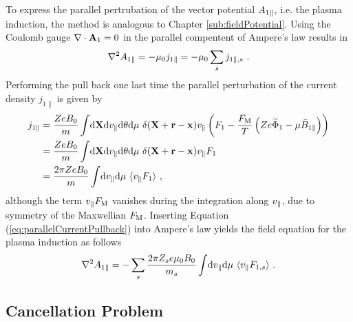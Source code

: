 To express the parallel pertrubation of the vector potential $A_{1\parallel}$, i.e. the plasma induction, the method is analogous to Chapter \ref{sub:fieldPotential}. Using the Coulomb gauge $\nabla \cdot \boldsymbol{\mathbf{A}}_1 = 0$ in the parallel compentent of Ampere's law results in
\begin{gather}
	\nabla^2 A_{1\parallel} = - \mu_0 j_{1\parallel} = - \mu_0 \sum_s j_{1\parallel,s}~.
	\label{eq:parallelAmpereLaw}
\end{gather}
Performing the pull back one last time the parallel perturbation of the current density $j_{1\parallel}$ is given by
\begin{gather}
	\begin{aligned}
		j_{1\parallel} &= \frac{Ze B_0}{m} \int \! \mathrm{d}\boldsymbol{\mathbf{X}}\mathrm{d}v_\parallel\mathrm{d}\theta\mathrm{d}\mu ~ \delta(\boldsymbol{\mathbf{X}} + \boldsymbol{\mathbf{r}} - \boldsymbol{\mathbf{x}}) v_\parallel \left(F_1 - \frac{F_\mathrm{M}}{T}\left(Ze \widetilde{\Phi}_1 - \mu \bar{B}_{1\parallel}\right) \right)\\
					   &= \frac{Ze B_0}{m} \int \! \mathrm{d}\boldsymbol{\mathbf{X}}\mathrm{d}v_\parallel\mathrm{d}\theta\mathrm{d}\mu ~ \delta(\boldsymbol{\mathbf{X}} + \boldsymbol{\mathbf{r}} - \boldsymbol{\mathbf{x}}) v_\parallel F_1 \\
					   &= \frac{2\pi Ze B_0}{m} \int \! \mathrm{d}v_\parallel\mathrm{d}\mu ~ \langle v_\parallel F_1\rangle~,
	\end{aligned}
	\label{eq:parallelCurrentPullback}
\end{gather}
although the term $v_\parallel F_\mathrm{M}$ vanishes during the integration along $v_\parallel$, due to symmetry of the Maxwellian $F_\mathrm{M}$. 
Inserting Equation (\ref{eq:parallelCurrentPullback}) into Ampere's law yields the field equation for the plasma induction as follows
\begin{gather}
	\nabla^2 A_{1\parallel} = - \sum_s \frac{2\pi Z_se \mu_0 B_0}{m_s}  \int \! \mathrm{d}v_\parallel\mathrm{d}\mu ~ \langle v_\parallel F_{1,s}\rangle~.
	\label{eq:fieldInduction}
\end{gather}
\newpage

\subsection{Cancellation Problem}
\label{sub:cancelProblem}

